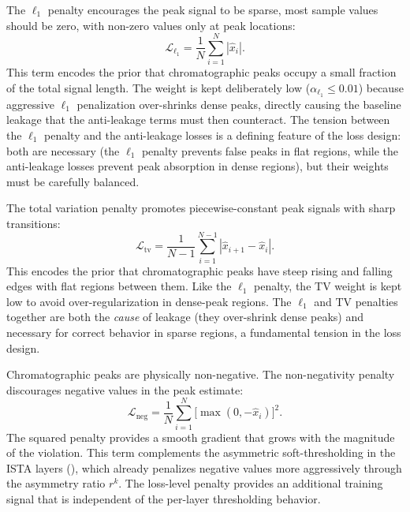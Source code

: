 The $\ell_1$ penalty encourages the peak signal to be sparse, most sample values should be zero, with non-zero values only at peak locations:
\begin{equation}
    \mathcal{L}_{\ell_1} = \frac{1}{N} \sum_{i=1}^{N} |\hat{x}_i|.
    \label{eq:l1_loss}
\end{equation}
This term encodes the prior that chromatographic peaks occupy a small fraction of the total signal length. The weight is kept deliberately low ($\alpha_{\ell_1} \leq 0.01$) because aggressive $\ell_1$ penalization over-shrinks dense peaks, directly causing the baseline leakage that the anti-leakage terms must then counteract. The tension between the $\ell_1$ penalty and the anti-leakage losses is a defining feature of the loss design: both are necessary (the $\ell_1$ penalty prevents false peaks in flat regions, while the anti-leakage losses prevent peak absorption in dense regions), but their weights must be carefully balanced.

The total variation penalty promotes piecewise-constant peak signals with sharp transitions:
\begin{equation}
    \mathcal{L}_{\text{tv}} = \frac{1}{N-1} \sum_{i=1}^{N-1} |\hat{x}_{i+1} - \hat{x}_i|.
    \label{eq:tv_loss}
\end{equation}
This encodes the prior that chromatographic peaks have steep rising and falling edges with flat regions between them. Like the $\ell_1$ penalty, the TV weight is kept low to avoid over-regularization in dense-peak regions. The $\ell_1$ and TV penalties together are both the \emph{cause} of leakage (they over-shrink dense peaks) and necessary for correct behavior in sparse regions, a fundamental tension in the loss design.

Chromatographic peaks are physically non-negative. The non-negativity penalty discourages negative values in the peak estimate:
\begin{equation}
    \mathcal{L}_{\text{neg}} = \frac{1}{N} \sum_{i=1}^{N} \big[\max(0, -\hat{x}_i)\big]^2.
    \label{eq:neg_loss}
\end{equation}
The squared penalty provides a smooth gradient that grows with the magnitude of the violation. This term complements the asymmetric soft-thresholding in the ISTA layers (), which already penalizes negative values more aggressively through the asymmetry ratio $r^k$. The loss-level penalty provides an additional training signal that is independent of the per-layer thresholding behavior.

